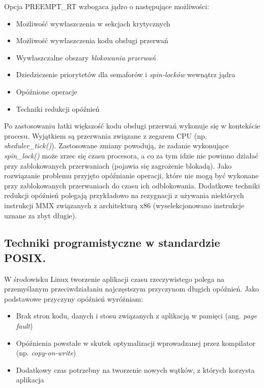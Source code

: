 Opcja PREEMPT\_RT wzbogaca jądro o następujące możliwości:

\begin{itemize}
\item Możliwość wywłaszczenia w sekcjach krytycznych
\item Możliwość wywłaszczenia kodu obsługi przerwań
\item Wywłaszczalne obszary \emph{blokowania przerwań}
\item Dziedziczenie priorytetów dla semaforów i \emph{spin-locków} wewnątrz jądra
\item Opóźnione operacje
\item Techniki redukcji opóźnień
\end{itemize}

Po zastosowaniu łatki większość kodu obsługi przerwań wykonuje się w kontekście procesu. Wyjątkiem są przerwania związane z zegarem CPU (np. \emph{sheduler\_tick()}). Zastosowane zmiany powodują, że zadanie wykonujące \emph{spin\_lock()} może zrzec się czasu procesora, a co za tym idzie nie powinno działać przy zablokowanych przerwaniach (pojawia się zagrożenie blokadą). Jako rozwiązanie problemu przyjęto opóźnianie operacji, które nie mogą być wykonane przy zablokowanych przerwaniach do czasu ich odblokowania. Dodatkowe techniki redukcji opóźnień polegają przykładowo na rezygnacji z używania niektórych instrukcji MMX związanych z architekturą x86 (wyselekcjonowano instrukcje uznane za zbyt długie).

\subsection{Techniki programistyczne w standardzie POSIX.}

W środowisku Linux tworzenie aplikacji czasu rzeczywistego polega na przemyślanym przeciwdziałaniu najczęstszym przyczynom długich opóźnień. Jako podstawowe przyczyny opóźnień wyróżniam:

\begin{itemize}
\item Brak stron kodu, danych i stosu związanych z aplikacją w pamięci (ang. \emph{page fault})
\item Opóźnienia powstałe w skutek optymalizacji wprowadzanej przez kompilator (np. \emph{copy-on-write})
\item Dodatkowy czas potrzebny na tworzenie nowych wątków, z których korzysta aplikacja
\end{itemize}

